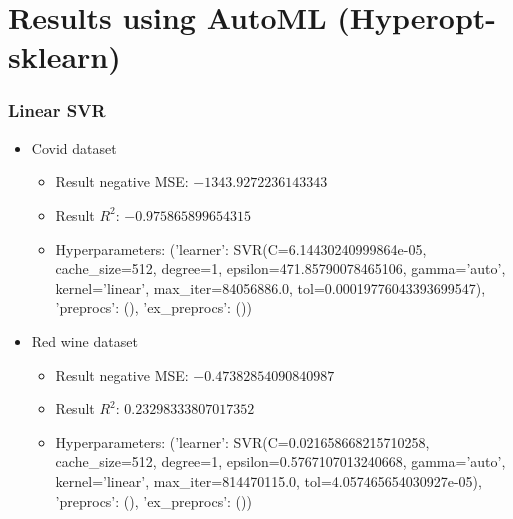 \documentclass{beamer}
\begin{document}
\section{Results using AutoML (Hyperopt-sklearn)}
\frame
{
  \frametitle{Linear SVR}

  \begin{itemize}
    \item Covid dataset
    \begin{itemize}
      \item Result negative MSE: $-1343.9272236143343$
      \item Result $R^{2}$: $-0.975865899654315$
      \item Hyperparameters: ('learner': SVR(C=6.14430240999864e-05, cache\_size=512, degree=1,
      epsilon=471.85790078465106, gamma='auto', kernel='linear',
      max\_iter=84056886.0, tol=0.00019776043393699547), 'preprocs': (), 'ex\_preprocs': ())
    \end{itemize}
    \item Red wine dataset
    \begin{itemize}
      \item Result negative MSE: $-0.47382854090840987$
      \item Result $R^{2}$: $0.23298333807017352$
      \item Hyperparameters: ('learner': SVR(C=0.021658668215710258, cache\_size=512, degree=1,
      epsilon=0.5767107013240668, gamma='auto', kernel='linear',
      max\_iter=814470115.0, tol=4.057465654030927e-05), 'preprocs': (), 'ex\_preprocs': ())
    \end{itemize}
  \end{itemize}
}
\end{document}
